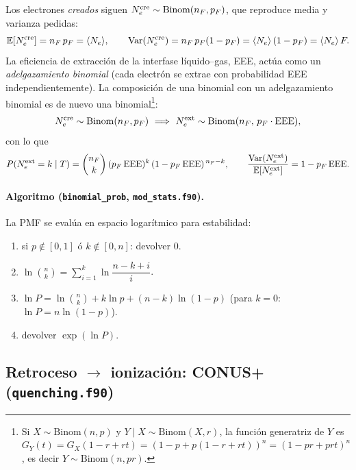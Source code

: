 \documentclass[11pt,a4paper]{article}
\newcommand{\Tnr}{T}
\newcommand{\Ne}{N_{e}}
\newcommand{\code}[1]{\texttt{#1}}
\begin{document}
Los electrones \emph{creados} siguen $\Ne^{\rm cre}\sim\mathrm{Binom}(n_{F},p_{F})$,
que reproduce media y varianza pedidas:
\begin{equation}
  \label{eq:binom_moments}
  \mathbb{E}[\Ne^{\rm cre}] = n_{F}\,p_{F} = \langle\Ne\rangle,
  \qquad
  \operatorname{Var}(\Ne^{\rm cre}) = n_{F}\,p_{F}(1-p_{F})
     = \langle\Ne\rangle\,(1-p_{F}) = \langle\Ne\rangle\,F .
\end{equation}
La eficiencia de extracci\'on de la interfase l\'iquido--gas, EEE, act\'ua como un
\emph{adelgazamiento binomial} (cada electr\'on se extrae con probabilidad EEE
independientemente). La composici\'on de una binomial con un adelgazamiento
binomial es de nuevo una binomial\footnote{Si $X\sim\mathrm{Binom}(n,p)$ y
$Y\mid X\sim\mathrm{Binom}(X,r)$, la funci\'on generatriz de $Y$ es
$G_{Y}(t)=G_{X}(1-r+rt)=(1-p+p(1-r+rt))^{n}=(1-pr+prt)^{n}$, es decir
$Y\sim\mathrm{Binom}(n,pr)$.}:
\begin{equation}
  \label{eq:binom_thinning}
  \Ne^{\rm cre}\sim\mathrm{Binom}(n_{F},p_{F})
  \ \Longrightarrow\
  \Ne^{\rm ext}\sim\mathrm{Binom}(n_{F},\,p_{F}\cdot\mathrm{EEE}),
\end{equation}
con lo que
\begin{equation}
  \label{eq:binom_pmf}
  P(\Ne^{\rm ext}=k\mid \Tnr)
  = \binom{n_{F}}{k}\,(p_{F}\,\mathrm{EEE})^{k}\,(1-p_{F}\,\mathrm{EEE})^{\,n_{F}-k},
  \qquad
  \frac{\operatorname{Var}(\Ne^{\rm ext})}{\mathbb{E}[\Ne^{\rm ext}]}
  = 1 - p_{F}\,\mathrm{EEE}.
\end{equation}

\paragraph{Algoritmo (\code{binomial\_prob}, \code{mod\_stats.f90}).}
La PMF se eval\'ua en espacio logar\'itmico para estabilidad:
\begin{enumerate}\itemsep2pt
  \item si $p\notin[0,1]$ \'o $k\notin[0,n]$: devolver $0$.
  \item $\ln\binom{n}{k} = \sum_{i=1}^{k}\ln\!\dfrac{n-k+i}{i}$.
  \item $\ln P = \ln\binom{n}{k} + k\ln p + (n-k)\ln(1-p)$
        (para $k=0$: $\ln P = n\ln(1-p)$).
  \item devolver $\exp(\ln P)$.
\end{enumerate}

\subsection{Retroceso $\to$ ionizaci\'on: CONUS+ (\code{quenching.f90})}
\label{sec:quench}
\end{document}
